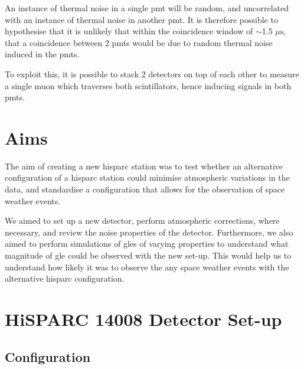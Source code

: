 An instance of thermal noise in a single \gls{pmt} will be random, and uncorrelated with an instance of thermal noise in another \gls{pmt}. It is therefore possible to hypothesise that it is unlikely that within the coincidence window of $\sim$1.5 $\mu \mathrm{s}$, that a coincidence between 2 \glspl{pmt} would be due to random thermal noise induced in the \glspl{pmt}.

To exploit this, it is possible to stack 2 detectors on top of each other to measure a single muon which traverses both scintillators, hence inducing signals in both \glspl{pmt}.



\section{Aims}\label{sec:HS_14008_aims}

The aim of creating a new \gls{hisparc} station was to test whether an alternative configuration of a \gls{hisparc} station could minimise atmospheric variations in the data, and standardise a configuration that allows for the observation of space weather events.

We aimed to set up a new detector, perform atmospheric corrections, where necessary, and review the noise properties of the detector. Furthermore, we also aimed to perform simulations of \glspl{gle} of varying properties to understand what magnitude of \gls{gle} could be observed with the new set-up. This would help us to understand how likely it was to observe the any space weather events with the alternative \gls{hisparc} configuration.



\section{HiSPARC 14008 Detector Set-up}\label{sec:HiSPARC_14008}


\subsection{Configuration}

